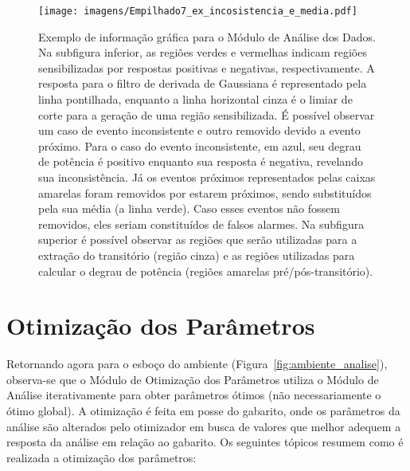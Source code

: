 \begin{sidewaysfigure}[p]
\centering
\texttt{[image: imagens/Empilhado7\_ex\_incosistencia\_e\_media.pdf]}
\caption[Exemplo de informação gráfica para o Módulo de Análise dos
Dados.]{Exemplo de informação gráfica para o Módulo de Análise dos
Dados. Na subfigura inferior, as regiões verdes e vermelhas indicam
regiões sensibilizadas por respostas positivas e negativas,
respectivamente. A resposta para o filtro de
derivada de Gaussiana é representado pela linha pontilhada, enquanto a
linha horizontal cinza é o limiar de corte para a geração de uma região
sensibilizada. É possível observar um caso de evento inconsistente e
outro removido devido a evento próximo. Para o caso do evento inconsistente, em azul, seu
degrau de potência é positivo enquanto sua resposta é negativa,
revelando sua inconsistência. Já os eventos próximos representados
pelas caixas amarelas foram removidos por estarem próximos, sendo
substituídos pela sua média (a linha verde). Caso esses eventos não
fossem removidos, eles seriam constituídos de falsos alarmes. Na
subfigura superior é possível observar as regiões que serão utilizadas
para a extração do transitório (região cinza) e as regiões utilizadas
para calcular o degrau de potência (regiões amarelas
pré/pós-transitório). } 
\label{fig:analise_eventos}
\end{sidewaysfigure}


\section{Otimização dos Parâmetros}
\label{sec:otimizacao}

Retornando agora para o esboço do ambiente
(Figura~\ref{fig:ambiente_analise}), observa-se que o Módulo de
Otimização dos Parâmetros utiliza o Módulo de Análise iterativamente
para obter parâmetros ótimos (não necessariamente o ótimo global).
A otimização é feita em posse do gabarito, onde os parâmetros da
análise são alterados pelo otimizador em busca de valores que melhor
adequem a resposta da análise em relação ao gabarito. Os seguintes
tópicos resumem como é realizada a otimização dos parâmetros:

